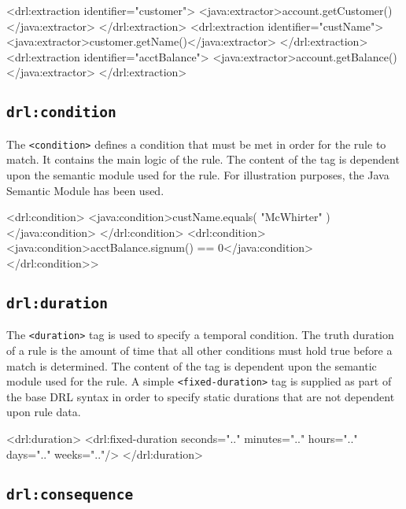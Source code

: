 \begin{codelisting}
<drl:extraction identifier="customer">
\textcolor{light}{  <java:extractor>account.getCustomer()</java:extractor>}
</drl:extraction>
<drl:extraction identifier="custName">
\textcolor{light}{  <java:extractor>customer.getName()</java:extractor>} 
</drl:extraction>
<drl:extraction identifier="acctBalance">
\textcolor{light}{  <java:extractor>account.getBalance()</java:extractor>}
</drl:extraction>
\end{codelisting}

\subsection{\texttt{drl:condition}}

The \verb|<condition>| defines a condition that must be met in
order for the rule to match. It contains the main logic of the rule.
The content of the tag is dependent upon the semantic module used for the rule.
For illustration purposes, the Java Semantic Module has been used.

\begin{codelisting}
<drl:condition>
\textcolor{light}{  <java:condition>custName.equals( "McWhirter" )</java:condition>}
</drl:condition>
<drl:condition>
\textcolor{light}{  <java:condition>acctBalance.signum() == 0</java:condition>}
</drl:condition>>
\end{codelisting}

\subsection{\texttt{drl:duration}}

The \verb|<duration>| tag is used to specify a temporal condition.
The truth duration of a rule is the amount of time that all other
conditions must hold true before a match is determined.  The
content of the tag is dependent upon the semantic module used
for the rule. A simple \verb|<fixed-duration>| tag is supplied as
part of the base DRL syntax in order to specify static durations
that are not dependent upon rule data.

\begin{codelisting}
<drl:duration>
  <drl:fixed-duration seconds=".."
                      minutes=".."
                      hours=".."
                      days=".."
                      weeks=".."/>
</drl:duration>
\end{codelisting}

\subsection{\texttt{drl:consequence}}


